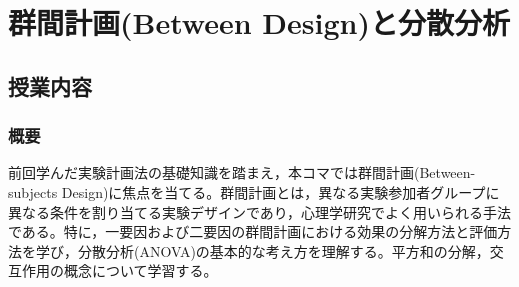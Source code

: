 \section{群間計画(Between Design)と分散分析}
\label{b18_BetweenDesign}

\subsection{授業内容}
\subsubsection{概要}

前回学んだ実験計画法の基礎知識を踏まえ，本コマでは群間計画(Between-subjects Design)に焦点を当てる。群間計画とは，異なる実験参加者グループに異なる条件を割り当てる実験デザインであり，心理学研究でよく用いられる手法である。特に，一要因および二要因の群間計画における効果の分解方法と評価方法を学び，分散分析(ANOVA)の基本的な考え方を理解する。平方和の分解，交互作用の概念について学習する。

